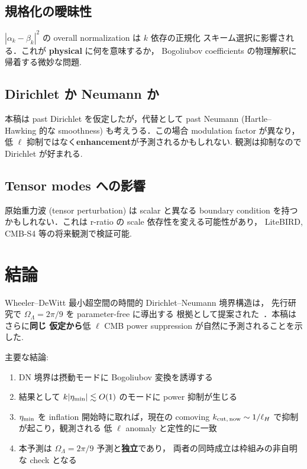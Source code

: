 \documentclass[11pt,a4paper]{article}
\begin{document}
\subsection{規格化の曖昧性}

$|\alpha_k - \beta_k|^2$ の overall normalization は $k$ 依存の正規化
スキーム選択に影響される．これが \textbf{physical} に何を意味するか，
Bogoliubov coefficients の物理解釈に帰着する微妙な問題.

\subsection{Dirichlet か Neumann か}

本稿は past Dirichlet を仮定したが，代替として past Neumann (Hartle--Hawking
的な smoothness) も考えうる．この場合 modulation factor が異なり，
低 $\ell$ 抑制ではなく\textbf{enhancement}が予測されるかもしれない.
観測は抑制なので Dirichlet が好まれる.

\subsection{Tensor modes への影響}

原始重力波 (tensor perturbation) は scalar と異なる boundary condition
を持つかもしれない．これは r-ratio の scale 依存性を変える可能性があり，
LiteBIRD, CMB-S4 等の将来観測で検証可能.

\section{結論}

Wheeler--DeWitt 最小超空間の時間的 Dirichlet--Neumann 境界構造は，
先行研究で $\Omega_\Lambda = 2\pi/9$ を parameter-free に導出する
根拠として提案された~\cite{WDW-DN-paper}．本稿はさらに\textbf{同じ
仮定から}低 $\ell$ CMB power suppression が自然に予測されることを示した.

主要な結論:
\begin{enumerate}
\item DN 境界は摂動モードに Bogoliubov 変換を誘導する
\item 結果として $k |\eta_{\rm min}| \lesssim O(1)$ のモードに power
抑制が生じる
\item $\eta_{\rm min}$ を inflation 開始時に取れば，現在の comoving
$k_{\rm cut,\,now} \sim 1/\ell_H$ で抑制が起こり，観測される
低 $\ell$ anomaly と定性的に一致
\item 本予測は $\Omega_\Lambda = 2\pi/9$ 予測と\textbf{独立}であり，
両者の同時成立は枠組みの非自明な check となる
\end{enumerate}
\end{document}
